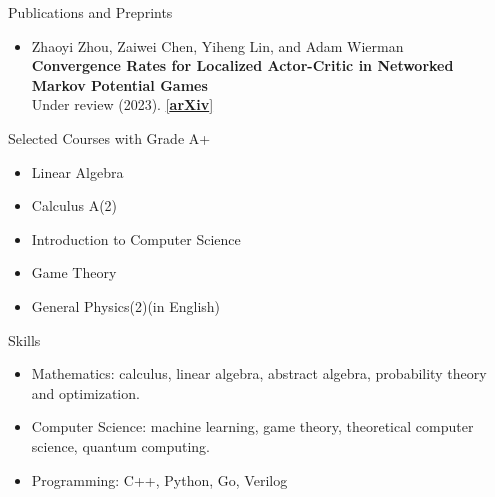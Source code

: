 \documentclass{resume} %
\begin{document}
\begin{rSection}{Publications and Preprints}
\begin{itemize}
    \item Zhaoyi Zhou, Zaiwei Chen, Yiheng Lin, and Adam Wierman \\
    \textbf{Convergence Rates for Localized Actor-Critic in Networked Markov Potential Games} \\
    Under review (2023). \href{https://arxiv.org/abs/2303.04865}{[\textbf{arXiv}]}
\end{itemize}

\end{rSection}

\begin{rSection}{Selected Courses with Grade A+}
    \begin{itemize}
        \item Linear Algebra 
        \item Calculus A(2)
        \item Introduction to Computer Science
        \item Game Theory 
        \item General Physics(2)(in English) 
    \end{itemize}
    
\end{rSection}

\begin{rSection}{Skills}
    \begin{itemize}
        \item Mathematics: calculus, linear algebra, abstract algebra, probability theory and optimization.
        \item Computer Science: machine learning, game theory, theoretical computer science, quantum computing. 
        \item Programming: C++, Python, Go, Verilog
    \end{itemize}
    
\end{rSection}
\end{document}

